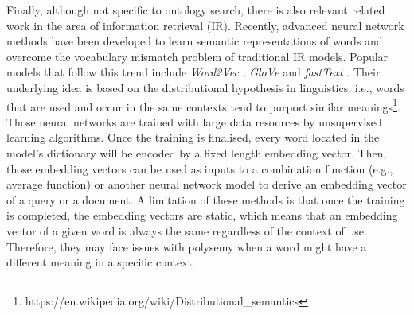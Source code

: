 \documentclass[preprint,12pt]{elsarticle}
\begin{document}
Finally, although not specific to ontology search, there is also relevant related work in the area of information retrieval (IR). Recently, advanced neural network methods have been developed to learn semantic representations of words and overcome the vocabulary mismatch problem of traditional IR models. Popular models that follow this trend include \textit{Word2Vec} \cite{Mikolov2013}, \textit{GloVe} \cite{Jeffrey2014} and \textit{fastText} \cite{Piotr2016}. Their underlying idea is based on the distributional hypothesis in linguistics, i.e., words that are used and occur in the same contexts tend to purport similar meanings\footnote{https://en.wikipedia.org/wiki/Distributional\_semantics}. Those neural networks are trained with large data resources by unsupervised learning algorithms. Once the training is finalised, every word located in the model's dictionary will be encoded by a fixed length embedding vector. Then, those embedding vectors can be used as inputs to a combination function (e.g., average function) or another neural network model to derive an embedding vector of a query or a document. A limitation of these methods is that once the training is completed, the embedding vectors are static, which means that an embedding vector of a given word is always the same regardless of the context of use. Therefore, they may face issues with polysemy when a word might have a different meaning in a specific context.

\end{document}
